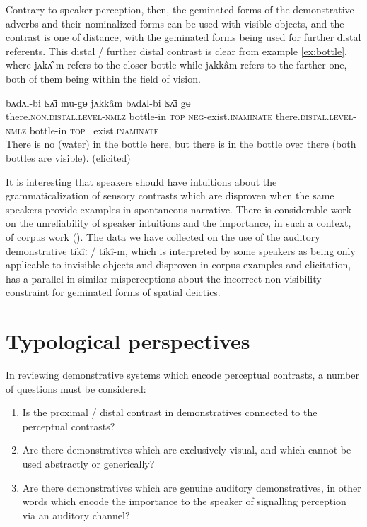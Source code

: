 \documentclass[oldfontcommands,oneside,a4paper,11pt]{article}
\newcommand{\ipa}[1]{{\phon \mbox{#1}}} %
\begin{document}
Contrary to speaker perception,   then, the geminated forms of the demonstrative adverbs and their nominalized   forms can be used with visible objects, and   the contrast is one of distance, with the geminated forms being used for further distal referents. This distal / further distal contrast   is clear from example \ref{ex:bottle}, where 	\ipa{jʌkʌ̂-m}  refers to the closer bottle  while \ipa{jʌkkâm}  	 refers to the farther one, both of them being within the field of vision.

\begin{exe} 
\ex \label{ex:bottle}
\gll      	\ipa{jʌkʌ̂-m}  	\ipa{bʌdʌl-bi}  	\ipa{ʦʌ̄i}  	\ipa{mu-gɵ}  	\ipa{jʌkkâm}  	\ipa{bʌdʌl-bi}  	\ipa{ʦʌ̄i}  	\ipa{gɵ}  \\
 there.\textsc{non.distal.level-nmlz} bottle-in \textsc{top} \textsc{neg}-exist.\textsc{inaminate} there.\textsc{distal.level-nmlz} bottle-in \textsc{top} \ exist.\textsc{inaminate} \\
\glt There is no (water) in the bottle here, but there is in the bottle over there (both bottles are visible). (elicited)
\end{exe}

It is interesting that speakers should have intuitions about the grammaticalization of sensory contrasts which are disproven when the same speakers provide examples in spontaneous narrative.  There is considerable work on the unreliability of speaker intuitions and the importance, in such a context, of corpus work (\citealt[164]{biber10corpus}).  The data we have collected on the use of the auditory demonstrative \ipa{tikîː} / \ipa{tikî-m}, which is interpreted by some speakers as being only applicable to invisible objects and disproven in corpus examples and elicitation, has a parallel in similar misperceptions about the incorrect non-visibility constraint for geminated forms of spatial deictics.


 
 

\section{Typological perspectives} \label{sec:typo}
In reviewing demonstrative systems which encode perceptual contrasts, a number of questions must be considered:
 
 \begin{enumerate}
\item Is the proximal / distal  contrast in demonstratives connected to the perceptual contrasts?
\item  Are there demonstratives which are exclusively visual, and which cannot be used abstractly or generically?
\item Are there demonstratives which are genuine auditory demonstratives, in other words which encode the importance to the speaker of signalling   perception via an auditory channel?
\end{enumerate}
\end{document}

